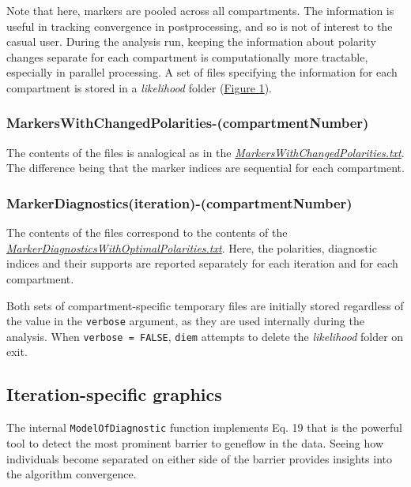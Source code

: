 \documentclass[
]{book}
\begin{document}
Note that here, markers are pooled across all compartments. The information is useful in tracking convergence in postprocessing, and so is not of interest to the casual user. During the analysis run, keeping the information about polarity changes separate for each compartment is computationally more tractable, especially in parallel processing. A set of files specifying the information for each compartment is stored in a \emph{likelihood} folder (\hyperref[fig1]{Figure 1}).

\subsubsection{MarkersWithChangedPolarities-(compartmentNumber)}\label{markerswithchangedpolarities-compartmentnumber}

The contents of the files is analogical as in the \hyperref[changedPolarities]{\emph{MarkersWithChangedPolarities.txt}}. The difference being that the marker indices are sequential for each compartment.

\subsubsection{MarkerDiagnostics(iteration)-(compartmentNumber)}\label{markerdiagnosticsiteration-compartmentnumber}

The contents of the files correspond to the contents of the \hyperref[markerDiagnostics]{\emph{MarkerDiagnosticsWithOptimalPolarities.txt}}. Here, the polarities, diagnostic indices and their supports are reported separately for each iteration and for each compartment.

Both sets of compartment-specific temporary files are initially stored regardless of the value in the \texttt{verbose} argument, as they are used internally during the analysis. When \texttt{verbose\ =\ FALSE}, \texttt{diem} attempts to delete the \emph{likelihood} folder on exit.

\subsection{Iteration-specific graphics}\label{iteration-specific-graphics}

The internal \texttt{ModelOfDiagnostic} function implements Eq. 19 \citep{Baird2023} that is the powerful tool to detect the most prominent barrier to geneflow in the data. Seeing how individuals become separated on either side of the barrier provides insights into the algorithm convergence.
\end{document}
